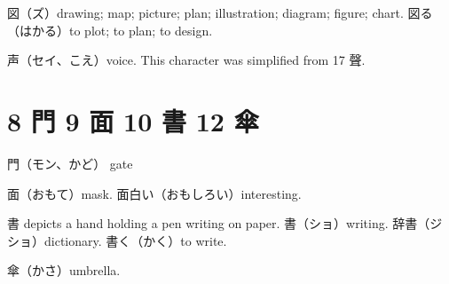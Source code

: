 図（ズ）drawing; map; picture; plan; illustration; diagram; figure; chart.
図る（はかる）to plot; to plan; to design.

声（セイ、こえ）voice.
This character was simplified from 17 聲.

\section{8 門 9 面 10 書 12 傘}

門（モン、かど） gate

面（おもて）mask.
面白い（おもしろい）interesting.

書 depicts a hand holding a pen writing on paper.
書（ショ）writing.
辞書（ジショ）dictionary.
書く（かく）to write.

傘（かさ）umbrella.
